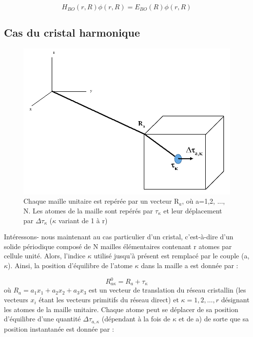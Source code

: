 \begin{equation}
H_{BO}(r,R)\phi(r,R) = E_{BO}(R)\phi(r,R)
\end{equation}

\subsection{Cas du cristal harmonique}

\begin{figure}[H]
	\centering
	\includegraphics[scale=0.5]{image/figsolid}
	\caption[Chaque maille unitaire est repérée par un vecteur R$_{a}$]{Chaque maille unitaire est repérée par un vecteur R$_{a}$, où a=1,2, ..., N. Les atomes de la maille sont repérés par $\tau_{\kappa}$ et leur déplacement par $\Delta\tau_{\kappa}$ ($\kappa$ variant de 1 à r)}
\end{figure}

Intéressons- nous maintenant au cas particulier d'un cristal, c'est-à-dire d'un solide périodique composé de N mailles élémentaires contenant r atomes par cellule unité. Alors, l'indice $\kappa$ utilisé jusqu'à présent est remplacé par le couple (a,$\kappa$). Ainsi, la position d'équilibre de l'atome $\kappa$ dans la maille a est donnée par :

\begin{equation}
R_{a\kappa}^{0}= R_{a} + \tau_{\kappa}
\end{equation}
où $R_{a}=a_{1}x_{1} + a_{2}x_{2} + a_{3}x_{3}$ est un vecteur de translation du réseau cristallin (les vecteurs $x_{i}$ étant les vecteurs primitifs du réseau direct) et $\kappa = 1, 2,\ldots,r$ désignant les atomes de la maille unitaire. Chaque atome peut se déplacer de sa position d'équilibre d'une quantité $\Delta\tau_{a,\kappa}$ (dépendant à la fois de $\kappa$ et de a) de sorte que sa position instantanée est donnée par :

